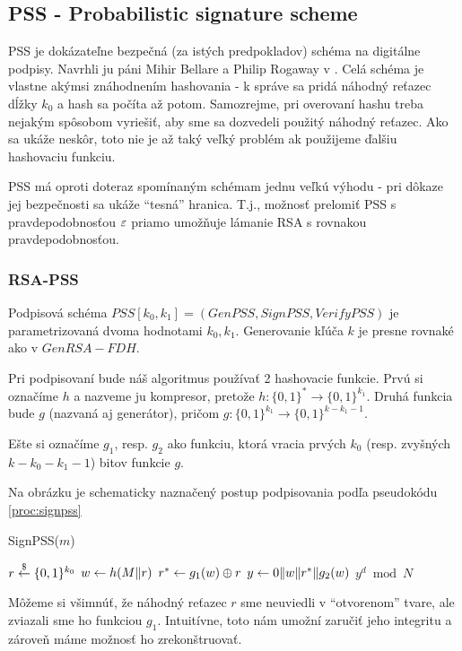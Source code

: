 \subsection{PSS - Probabilistic signature scheme}

PSS je dokázateľne bezpečná (za istých predpokladov) schéma na
digitálne podpisy. Navrhli ju páni Mihir Bellare a Philip Rogaway
v \cite{pss}. Celá schéma je vlastne akýmsi znáhodnením hashovania - k
správe sa pridá náhodný reťazec dĺžky $k_0$ a hash sa počíta až
potom. Samozrejme, pri overovaní hashu treba nejakým spôsobom
vyriešiť, aby sme sa dozvedeli použitý náhodný reťazec. Ako sa ukáže
neskôr, toto nie je až taký veľký problém ak použijeme ďalšiu
hashovaciu funkciu.

PSS má oproti doteraz spomínaným schémam jednu veľkú výhodu - pri
dôkaze jej bezpečnosti sa ukáže ``tesná'' hranica. T.j., možnosť
prelomiť PSS s pravdepodobnosťou $\varepsilon$ priamo umožňuje lámanie RSA s
rovnakou pravdepodobnosťou.


\subsubsection{RSA-PSS}

Podpisová schéma $PSS[k_0,k_1]=(GenPSS,SignPSS,VerifyPSS)$ je
parametrizovaná dvoma hodnotami $k_0, k_1$.
Generovanie kľúča $k$ je presne rovnaké ako v $GenRSA-FDH$.

Pri podpisovaní bude náš algoritmus používať 2 hashovacie funkcie.
Prvú si označíme $h$ a nazveme ju kompresor, pretože 
$h:\{0,1\}^* \rightarrow \{0,1\}^{k_1}$.
Druhá funkcia bude $g$ (nazvaná aj generátor), pričom
$g:\{0,1\}^{k_1} \rightarrow \{0,1\}^{k-k_1-1}$.

Ešte si označíme $g_1$, resp. $g_2$ ako funkciu, ktorá vracia
prvých $k_0$ (resp. zvyšných $k-k_0-k_1-1$) bitov funkcie $g$.

Na obrázku \todo{} je schematicky naznačený postup podpisovania
podľa pseudokódu \ref{proc:signpss}

\begin{procedure}
    \caption{SignPSS($m$)}
    \label{proc:signpss}
    $r \overset{\$}{\leftarrow} \{0,1\}^{k_0}$\;
    $w \leftarrow h(M \| r)$\;
    $r^* \leftarrow g_1(w) \oplus r$\;
    $y \leftarrow 0 \| w \| r^* \| g_2(w)$\;
    \Return $y^d \bmod N$\;
\end{procedure}

Môžeme si všimnúť, že náhodný reťazec $r$ sme neuviedli v
``otvorenom'' tvare, ale zviazali sme ho funkciou $g_1$. Intuitívne,
toto nám umožní zaručiť jeho integritu a zároveň máme možnosť ho
zrekonštruovať.

